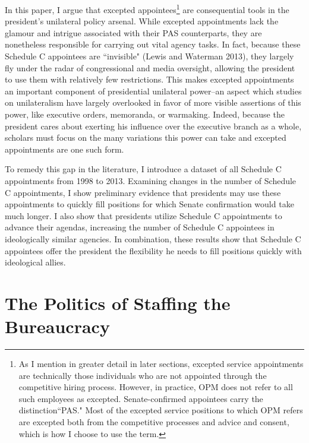 \documentclass[12pt]{article}
\begin{document}
	In this paper, I argue that excepted appointees\footnote{As I mention in greater detail in later sections, excepted service appointments are technically those individuals who are not appointed through the competitive hiring process. However, in practice, OPM does not refer to all such employees as excepted. Senate-confirmed appointees carry the distinction``PAS." Most of the excepted service positions to which OPM refers are excepted both from the competitive processes and advice and consent, which is how I choose to use the term.} are consequential tools in the president's unilateral policy arsenal. While excepted appointments lack the glamour and intrigue associated with their PAS counterparts, they are nonetheless responsible for carrying out vital agency tasks. In fact, because these Schedule C appointees are ``invisible" (Lewis and Waterman 2013), they largely fly under the radar of congressional and media oversight, allowing the president to use them with relatively few restrictions. This makes excepted appointments an important component of presidential unilateral power--an aspect which studies on unilateralism have largely overlooked in favor of more visible assertions of this power, like executive orders, memoranda, or warmaking. Indeed, because the president cares about exerting his influence over the executive branch as a whole, scholars must focus on the many variations this power can take and excepted appointments are one such form. 

		To remedy this gap in the literature, I introduce a dataset of all Schedule C appointments from 1998 to 2013. Examining changes in the number of Schedule C appointments, I show preliminary evidence that presidents may use these appointments to quickly fill positions for which Senate confirmation would take much longer. I also show that presidents utilize Schedule C appointments to advance their agendas, increasing the number of Schedule C appointees in ideologically similar agencies. In combination, these results show that Schedule C appointees offer the president the flexibility he needs to fill positions quickly with ideological allies.
		
\section*{The Politics of Staffing the Bureaucracy}
\end{document}

